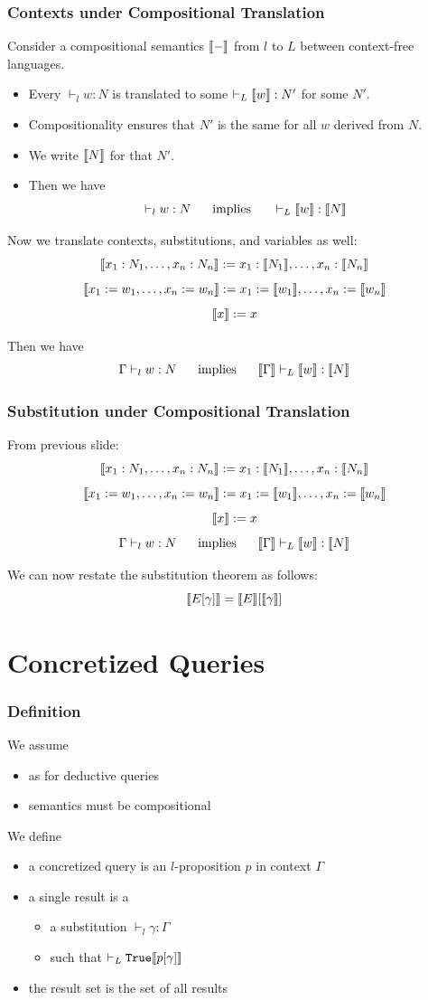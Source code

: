 \documentclass{beamer}
\renewcommand{\emph}[1]{\alert{#1}}
\begin{document}
\begin{frame}\frametitle{Contexts under Compositional Translation}
Consider a compositional semantics $\llbracket -\rrbracket$ from $l$ to $L$ between context-free languages.

\begin{itemize}
 \item Every $\vdash_l w:N$ is translated to some $\vdash_L \llbracket w\rrbracket:N'$ for some $N'$.
 \item Compositionality ensures that $N'$ is the same for all $w$ derived from $N$.
 \item We write $\llbracket N\rrbracket$ for that $N'$.
 \item Then we have 
  \[\vdash_l w:N \hspace*{.5cm}\;\mathrm{implies}\;\hspace*{.5cm} \vdash_L \llbracket w\rrbracket:\llbracket N\rrbracket\]
\end{itemize}

Now we translate contexts, substitutions, and variables as well:
\[\llbracket x_1:N_1,\ldots,x_n:N_n\rrbracket:=x_1:\llbracket N_1\rrbracket,\ldots,x_n:\llbracket N_n\rrbracket\]
\[\llbracket x_1:=w_1,\ldots,x_n:=w_n\rrbracket:=x_1:=\llbracket w_1\rrbracket,\ldots,x_n:=\llbracket w_n\rrbracket\]
\[\llbracket x\rrbracket:=x\]

Then we have
  \[\Gamma\vdash_l w:N \hspace*{.5cm}\;\mathrm{implies}\;\hspace*{.5cm} \llbracket \Gamma\rrbracket\vdash_L \llbracket w\rrbracket:\llbracket N\rrbracket\]
\end{frame}

\begin{frame}\frametitle{Substitution under Compositional Translation}
From previous slide:
\[\llbracket x_1:N_1,\ldots,x_n:N_n\rrbracket:=x_1:\llbracket N_1\rrbracket,\ldots,x_n:\llbracket N_n\rrbracket\]
\[\llbracket x_1:=w_1,\ldots,x_n:=w_n\rrbracket:=x_1:=\llbracket w_1\rrbracket,\ldots,x_n:=\llbracket w_n\rrbracket\]
\[\llbracket x\rrbracket:=x\]
\[\Gamma\vdash_l w:N \hspace*{.5cm}\;\mathrm{implies}\;\hspace*{.5cm} \llbracket \Gamma\rrbracket\vdash_L \llbracket w\rrbracket:\llbracket N\rrbracket\]

We can now restate the substitution theorem as follows:
  \[\llbracket E[\gamma]\rrbracket=\llbracket E\rrbracket[\llbracket \gamma\rrbracket]\]
\end{frame}

\section{Concretized Queries}

\begin{frame}\frametitle{Definition}
We assume
\begin{itemize}
\item as for deductive queries
\item semantics must be compositional
\end{itemize}

We define
\begin{itemize}
\item a concretized query is an $l$-proposition $p$ in context $\Gamma$
\item a \emph{single} result is a
 \begin{itemize}
 \item a substitution $\vdash_l \gamma:\Gamma$
 \item such that $\vdash_L \mathtt{True} \llbracket p[\gamma]\rrbracket$
 \end{itemize}
\item the \emph{result set} is the set of all results
\end{itemize}
\end{frame}
\end{document}

